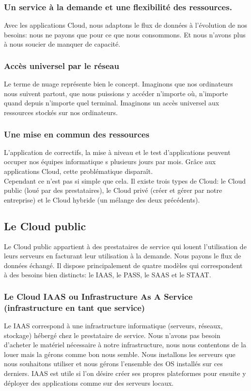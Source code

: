   \subsubsection{Un service à la demande et une flexibilité des ressources.}
  Avec les applications Cloud, nous adaptons le flux de données à l'évolution de nos besoins: nous ne payons que pour ce que nous consommons. Et nous n'avons plus à nous soucier de manquer de capacité.

  \subsubsection{Accès universel par le réseau}
  Le terme de nuage représente bien le concept. Imaginons que nos ordinateurs nous suivent partout, que nous puissions y accéder n’importe où, n’importe quand depuis n’importe quel terminal. Imaginons un accès universel aux ressources stockés sur nos ordinateurs.

  \subsubsection{Une mise en commun des ressources}
  L'application de correctifs, la mise à niveau et le test d'applications peuvent occuper nos équipes informatique s plusieurs jours par mois. Grâce aux applications Cloud, cette problématique disparaît.\\

  Cependant ce n’est pas si simple que cela. Il existe trois types de Cloud: le Cloud public (loué par des prestataires), le Cloud privé (créer et gérer par notre entreprise) et le Cloud hybride (un mélange des deux précédents).

  \subsection{Le Cloud public}
  Le Cloud public appartient à des prestataires de service qui louent l’utilisation de leurs serveurs en facturant leur utilisation à la demande. Nous payons le flux de données échangé. Il dispose principalement de quatre modèles qui correspondent à des besoins bien distincts: le IAAS, le PASS, le SAAS et le STAAT.

    \subsubsection{Le Cloud IAAS ou Infrastructure As A Service (infrastructure en tant que service)}
    Le IAAS correspond à une infrastructure informatique (serveurs, réseaux, stockage) hébergé chez le prestataire de service. Nous n’avons pas besoin d’acheter le matériel nécessaire à notre infrastructure, nous nous contentons de la louer mais la gérons comme bon nous semble. Nous installons les serveurs que nous souhaitons utiliser et nous gérons l’ensemble des OS installés sur ces derniers. IAAS est utile si l’on désire créer ses propres plateformes pour ensuite y déployer des applications comme sur des serveurs locaux.

